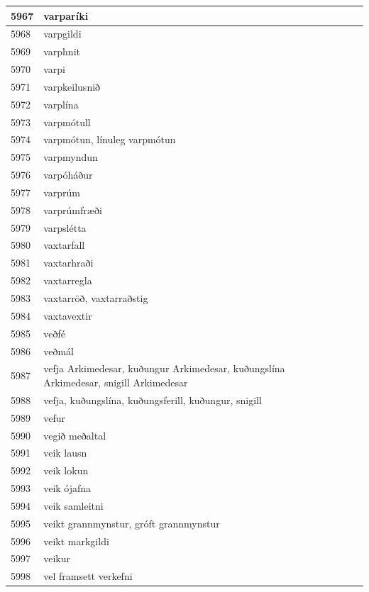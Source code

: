 \begin{longtable}{p{}|p{}|p{}|p{}|p{}}
\hline
5967 & varparíki &  &  &  \\
\hline
5968 & varpgildi &  &  &  \\
\hline
5969 & varphnit &  &  &  \\
\hline
5970 & varpi &  &  &  \\
\hline
5971 & varpkeilusnið &  &  &  \\
\hline
5972 & varplína &  &  &  \\
\hline
5973 & varpmótull &  &  &  \\
\hline
5974 & varpmótun, línuleg varpmótun &  &  &  \\
\hline
5975 & varpmyndun &  &  &  \\
\hline
5976 & varpóháður &  &  &  \\
\hline
5977 & varprúm &  &  &  \\
\hline
5978 & varprúmfræði &  &  &  \\
\hline
5979 & varpslétta &  &  &  \\
\hline
5980 & vaxtarfall &  &  &  \\
\hline
5981 & vaxtarhraði &  &  &  \\
\hline
5982 & vaxtarregla &  &  &  \\
\hline
5983 & vaxtarröð, vaxtarraðstig &  &  &  \\
\hline
5984 & vaxtavextir &  &  &  \\
\hline
5985 & veðfé &  &  &  \\
\hline
5986 & veðmál &  &  &  \\
\hline
5987 & vefja Arkimedesar, kuðungur Arkimedesar, kuðungslína Arkimedesar, snigill Arkimedesar &  &  &  \\
\hline
5988 & vefja, kuðungslína, kuðungsferill, kuðungur, snigill &  &  &  \\
\hline
5989 & vefur &  &  &  \\
\hline
5990 & vegið meðaltal &  &  &  \\
\hline
5991 & veik lausn &  &  &  \\
\hline
5992 & veik lokun &  &  &  \\
\hline
5993 & veik ójafna &  &  &  \\
\hline
5994 & veik samleitni &  &  &  \\
\hline
5995 & veikt grannmynstur, gróft grannmynstur &  &  &  \\
\hline
5996 & veikt markgildi &  &  &  \\
\hline
5997 & veikur &  &  &  \\
\hline
5998 & vel framsett verkefni &  &  &  \\

\end{longtable}
